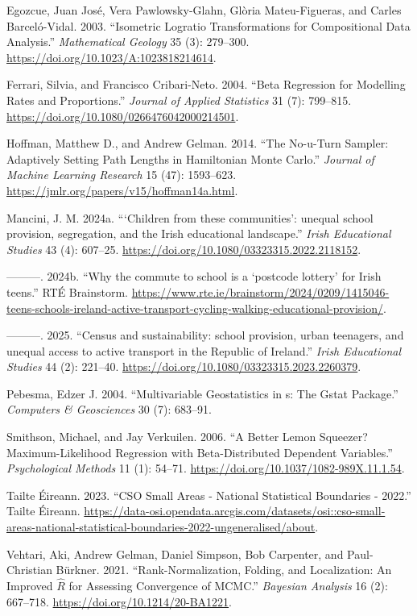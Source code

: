 \documentclass{article}
\newlength{\cslhangindent}
\newenvironment{CSLReferences}[2] %
 {\begin{list}{}{%
  \setlength{\itemindent}{0pt}
  \setlength{\leftmargin}{0pt}
  \setlength{\parsep}{0pt}
  \ifodd #1
   \setlength{\leftmargin}{\cslhangindent}
   \setlength{\itemindent}{-1\cslhangindent}
  \fi
  \setlength{\itemsep}{#2\baselineskip}}}
 {\end{list}}
\begin{document}
\begin{CSLReferences}{1}{0}
Egozcue, Juan José, Vera Pawlowsky-Glahn, Glòria Mateu-Figueras, and
Carles Barceló-Vidal. 2003. {``Isometric Logratio Transformations for
Compositional Data Analysis.''} \emph{Mathematical Geology} 35 (3):
279--300. \url{https://doi.org/10.1023/A:1023818214614}.

Ferrari, Silvia, and Francisco Cribari-Neto. 2004. {``Beta Regression
for Modelling Rates and Proportions.''} \emph{Journal of Applied
Statistics} 31 (7): 799--815.
\url{https://doi.org/10.1080/0266476042000214501}.

Hoffman, Matthew D., and Andrew Gelman. 2014. {``The No-u-Turn Sampler:
Adaptively Setting Path Lengths in Hamiltonian Monte Carlo.''}
\emph{Journal of Machine Learning Research} 15 (47): 1593--623.
\url{https://jmlr.org/papers/v15/hoffman14a.html}.

Mancini, J. M. 2024a. {``{{`Children from these communities'}: unequal
school provision, segregation, and the Irish educational landscape}.''}
\emph{Irish Educational Studies} 43 (4): 607--25.
\url{https://doi.org/10.1080/03323315.2022.2118152}.

---------. 2024b. {``{Why the commute to school is a {`postcode
lottery'} for Irish teens}.''} {RTÉ Brainstorm}.
\url{https://www.rte.ie/brainstorm/2024/0209/1415046-teens-schools-ireland-active-transport-cycling-walking-educational-provision/}.

---------. 2025. {``{Census and sustainability: school provision, urban
teenagers, and unequal access to active transport in the Republic of
Ireland}.''} \emph{Irish Educational Studies} 44 (2): 221--40.
\url{https://doi.org/10.1080/03323315.2023.2260379}.

Pebesma, Edzer J. 2004. {``Multivariable Geostatistics in s: The Gstat
Package.''} \emph{Computers \& Geosciences} 30 (7): 683--91.

Smithson, Michael, and Jay Verkuilen. 2006. {``A Better Lemon Squeezer?
Maximum-Likelihood Regression with Beta-Distributed Dependent
Variables.''} \emph{Psychological Methods} 11 (1): 54--71.
\url{https://doi.org/10.1037/1082-989X.11.1.54}.

Tailte Éireann. 2023. {``{CSO Small Areas - National Statistical
Boundaries - 2022}.''} {Tailte Éireann}.
\url{https://data-osi.opendata.arcgis.com/datasets/osi::cso-small-areas-national-statistical-boundaries-2022-ungeneralised/about}.

Vehtari, Aki, Andrew Gelman, Daniel Simpson, Bob Carpenter, and
Paul-Christian Bürkner. 2021. {``Rank-Normalization, Folding, and
Localization: An Improved \(\widehat{R}\) for Assessing Convergence of
{MCMC}.''} \emph{Bayesian Analysis} 16 (2): 667--718.
\url{https://doi.org/10.1214/20-BA1221}.

\end{CSLReferences}



\end{document}
